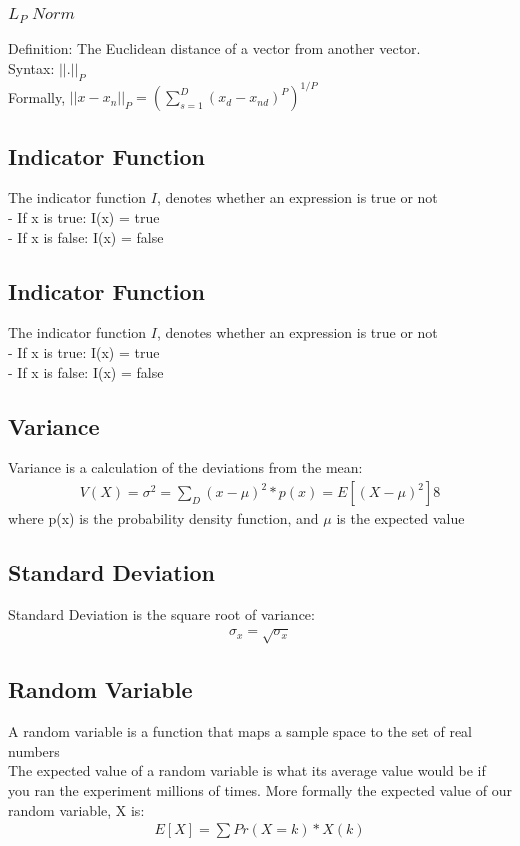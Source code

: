 \documentclass{article}
\begin{document}
\subsubsection{$L_P\;Norm$}
Definition: The Euclidean distance of a vector from another vector.\\
Syntax: $||.||_P$\\
Formally, $||x-x_n||_P = (\sum^D_{s=1}{(x_d - x_{nd})^P})^{1/P}$

\subsection{Indicator Function}
The indicator function $I$, denotes whether an expression is true or not\\
- If x is true: I(x) = true\\
- If x is false: I(x) = false

\subsection{Indicator Function}
The indicator function $I$, denotes whether an expression is true or not\\
- If x is true: I(x) = true\\
- If x is false: I(x) = false

\subsection{Variance}
Variance is a calculation of the deviations from the mean:\\
\begin{align*}
V(X) = \sigma^2 = \sum_D(x-\mu)^2 * p(x) = E[(X-\mu)^2]8
\end{align*}
where p(x) is the probability density function, and $\mu$ is the expected value


\subsection{Standard Deviation}
Standard Deviation is the square root of variance:\\
\begin{align*}
\sigma_x = \sqrt{\sigma_x}
\end{align*}

\subsection{Random Variable}
A random variable is a function that maps a sample space to the set of real numbers\\
The expected value of a random variable is what its average value would be if you ran the experiment millions of times. More formally the expected value of our random variable, X is:\\
\begin{align*}
E[X] = \sum{Pr(X=k) * X(k)}
\end{align*}
\end{document}

